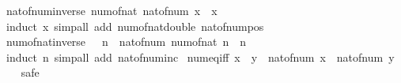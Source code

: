 \begin{isabellebody}
\ nat{\isacharunderscore}{\kern0pt}of{\isacharunderscore}{\kern0pt}num{\isacharunderscore}{\kern0pt}inverse{\isacharcolon}{\kern0pt}\ {\isachardoublequoteopen}num{\isacharunderscore}{\kern0pt}of{\isacharunderscore}{\kern0pt}nat\ {\isacharparenleft}{\kern0pt}nat{\isacharunderscore}{\kern0pt}of{\isacharunderscore}{\kern0pt}num\ x{\isacharparenright}{\kern0pt}\ {\isacharequal}{\kern0pt}\ x{\isachardoublequoteclose}\isanewline
%
\isadelimproof
\ \ %
\endisadelimproof
%
\isatagproof
{}\isamarkupfalse%
\ {\isacharparenleft}{\kern0pt}induct\ x{\isacharparenright}{\kern0pt}\ {\isacharparenleft}{\kern0pt}simp{\isacharunderscore}{\kern0pt}all\ add{\isacharcolon}{\kern0pt}\ num{\isacharunderscore}{\kern0pt}of{\isacharunderscore}{\kern0pt}nat{\isacharunderscore}{\kern0pt}double\ nat{\isacharunderscore}{\kern0pt}of{\isacharunderscore}{\kern0pt}num{\isacharunderscore}{\kern0pt}pos{\isacharparenright}{\kern0pt}%
\endisatagproof
{\isafoldproof}%
%
\isadelimproof
\isanewline
%
\endisadelimproof
\isanewline
{}\isamarkupfalse%
\ num{\isacharunderscore}{\kern0pt}of{\isacharunderscore}{\kern0pt}nat{\isacharunderscore}{\kern0pt}inverse{\isacharcolon}{\kern0pt}\ {\isachardoublequoteopen}{}\ {\isacharless}{\kern0pt}\ n\ {\isasymLongrightarrow}\ nat{\isacharunderscore}{\kern0pt}of{\isacharunderscore}{\kern0pt}num\ {\isacharparenleft}{\kern0pt}num{\isacharunderscore}{\kern0pt}of{\isacharunderscore}{\kern0pt}nat\ n{\isacharparenright}{\kern0pt}\ {\isacharequal}{\kern0pt}\ n{\isachardoublequoteclose}\isanewline
%
\isadelimproof
\ \ %
\endisadelimproof
%
\isatagproof
{}\isamarkupfalse%
\ {\isacharparenleft}{\kern0pt}induct\ n{\isacharparenright}{\kern0pt}\ {\isacharparenleft}{\kern0pt}simp{\isacharunderscore}{\kern0pt}all\ add{\isacharcolon}{\kern0pt}\ nat{\isacharunderscore}{\kern0pt}of{\isacharunderscore}{\kern0pt}num{\isacharunderscore}{\kern0pt}inc{\isacharparenright}{\kern0pt}%
\endisatagproof
{\isafoldproof}%
%
\isadelimproof
\isanewline
%
\endisadelimproof
\isanewline
{}\isamarkupfalse%
\ num{\isacharunderscore}{\kern0pt}eq{\isacharunderscore}{\kern0pt}iff{\isacharcolon}{\kern0pt}\ {\isachardoublequoteopen}x\ {\isacharequal}{\kern0pt}\ y\ {\isasymlongleftrightarrow}\ nat{\isacharunderscore}{\kern0pt}of{\isacharunderscore}{\kern0pt}num\ x\ {\isacharequal}{\kern0pt}\ nat{\isacharunderscore}{\kern0pt}of{\isacharunderscore}{\kern0pt}num\ y{\isachardoublequoteclose}\isanewline
%
\isadelimproof
\ \ %
\endisadelimproof
%
\isatagproof
{}\isamarkupfalse%
\ safe\isanewline
\ \ \isamarkupfalse%

\end{isabellebody}
